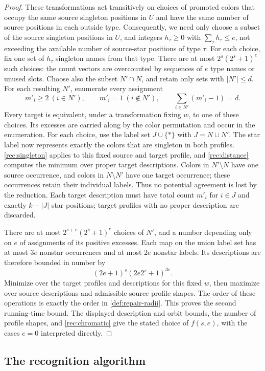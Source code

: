 \documentclass[10pt,a4paper]{amsart}
\numberwithin{equation}{section}
\theoremstyle{definition}
\theoremstyle{remark}
\begin{document}
\begin{proof}
These transformations act transitively on choices of promoted colors
that occupy the same source singleton positions in $U$ and have the
same number of source positions in each outside type. Consequently,
we need only choose a subset of the source singleton positions in
$U$, and integers $h_\tau\geq0$ with $\sum_\tau h_\tau\leq e$,
not exceeding the available number of source-star positions of type
$\tau$. For each choice, fix one set of $h_\tau$ singleton
names from that type. There are at most
$2^s(2^s+1)^e$ such choices: the count vectors are overcounted
by sequences of $e$ type names or unused slots.
Choose also the subset $N'\cap N$, and retain only sets with
$|N'|\leq d$. For each resulting $N'$, enumerate every assignment
\[
m'_i\geq2\ (i\in N'),\qquad m'_i=1\ (i\notin N'),\qquad
\sum_{i\in N'}(m'_i-1)=d.
\]
Every target is equivalent, under a transformation fixing $w$,
to one of these choices. Its excesses are carried along by the
color permutation and occur in the enumeration. For each choice, use the
label set $J\cup\{*\}$ with $J=N\cup N'$. The star label now
represents exactly the colors that are singleton in both profiles.
\cref{rec:singleton} applies to this fixed source and target
profile, and \cref{rec:distance} computes the minimum over
proper target descriptions. Colors in $N'\setminus N$ have one
source occurrence, and colors in $N\setminus N'$ have one target
occurrence; these occurrences retain their individual labels.
Thus no potential agreement is lost by the reduction. Each target
description must have total count $m'_i$ for $i\in J$ and exactly
$k-|J|$ star positions; target profiles with no proper description
are discarded.

There are at most $2^{s+e}(2^s+1)^e$ choices of $N'$, and a number
depending only on $e$ of assignments of its positive excesses.
Each map on the union label set has at most $3e$ nonstar
occurrences and at most $2e$ nonstar labels. Its descriptions are
therefore bounded in number by
\[
(2e+1)^s(2e2^s+1)^{3e}.
\]
Minimize over the target profiles and descriptions for this fixed
$w$, then maximize over source descriptions and admissible source
profile shapes. The order of these operations is exactly the
order in \cref{def:repair-radii}. This proves the second
running-time bound. The displayed description and orbit bounds, the number
of profile shapes, and \cref{rec:chromatic} give the stated
choice of $f(s,e)$, with the cases $e=0$ interpreted directly.
\end{proof}


\subsection{The recognition algorithm}
\end{document}
